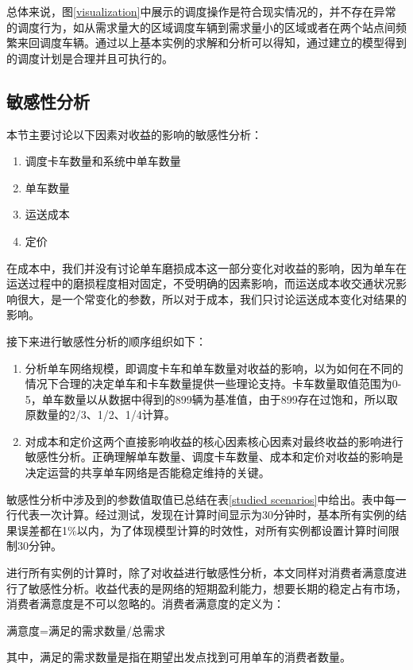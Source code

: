\documentclass[]{tongjithesis}
\numberwithin{equation}{chapter}
\begin{document}
总体来说，图\ref{visualization}中展示的调度操作是符合现实情况的，并不存在异常的调度行为，如从需求量大的区域调度车辆到需求量小的区域或者在两个站点间频繁来回调度车辆。通过以上基本实例的求解和分析可以得知，通过建立的模型得到的调度计划是合理并且可执行的。
\subsection{敏感性分析}
本节主要讨论以下因素对收益的影响的敏感性分析：
\begin{enumerate}
	\item 调度卡车数量和系统中单车数量
	\item 单车数量
	\item 运送成本
	\item 定价
\end{enumerate}
在成本中，我们并没有讨论单车磨损成本这一部分变化对收益的影响，因为单车在运送过程中的磨损程度相对固定，不受明确的因素影响，而运送成本收交通状况影响很大，是一个常变化的参数，所以对于成本，我们只讨论运送成本变化对结果的影响。

接下来进行敏感性分析的顺序组织如下：
\begin{enumerate}
	\item 分析单车网络规模，即调度卡车和单车数量对收益的影响，以为如何在不同的情况下合理的决定单车和卡车数量提供一些理论支持。卡车数量取值范围为0-5，单车数量以从数据中得到的899辆为基准值，由于899存在过饱和，所以取原数量的2/3、1/2、1/4计算。
	\item 对成本和定价这两个直接影响收益的核心因素核心因素对最终收益的影响进行敏感性分析。正确理解单车数量、调度卡车数量、成本和定价对收益的影响是决定运营的共享单车网络是否能稳定维持的关键。
\end{enumerate}
	
敏感性分析中涉及到的参数值取值已总结在表\ref{studied scenarios}中给出。表中每一行代表一次计算。经过测试，发现在计算时间显示为30分钟时，基本所有实例的结果误差都在1\%以内，为了体现模型计算的时效性，对所有实例都设置计算时间限制30分钟。

进行所有实例的计算时，除了对收益进行敏感性分析，本文同样对消费者满意度进行了敏感性分析。收益代表的是网络的短期盈利能力，想要长期的稳定占有市场，消费者满意度是不可以忽略的。消费者满意度的定义为：
\begin{center}
满意度=满足的需求数量/总需求
\end{center}
其中，满足的需求数量是指在期望出发点找到可用单车的消费者数量。
\end{document}
